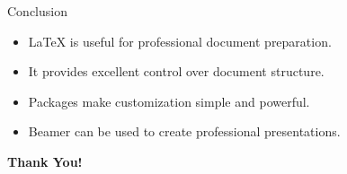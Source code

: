 \documentclass{beamer}
\begin{document}
\begin{frame}{Conclusion}

\begin{itemize}
    \item LaTeX is useful for professional document preparation.
    \item It provides excellent control over document structure.
    \item Packages make customization simple and powerful.
    \item Beamer can be used to create professional presentations.
\end{itemize}

\vspace{1cm}

\centering
\textbf{Thank You!}

\end{frame}
\end{document}
